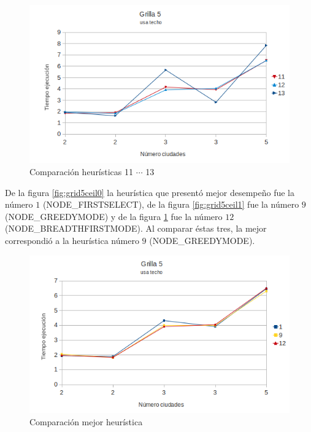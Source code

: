 \documentclass[a4paper,10pt]{article}
\begin{document}
\begin{figure}[ht]
\begin{minipage}[b]{1\linewidth}
  \centering
 \includegraphics[scale=0.4]{grilla5ceil2.png}
 \caption{Comparación heurísticas  11 $\cdots$ 13}
 \label{fig:grid5ceil2}
\end{minipage}

\end{figure}


De la figura \ref{fig:grid5ceil0} la heurística que presentó mejor desempeño fue la número $1$ (NODE\_FIRSTSELECT), de la figura \ref{fig:grid5ceil1} fue la número $9$ (NODE\_GREEDYMODE) y de la 
figura \ref{fig:grid5ceil2} fue la número $12$ (NODE\_BREADTHFIRSTMODE). Al comparar éstas tres, la mejor correspondió a la heurística número $9$ (NODE\_GREEDYMODE).

\begin{figure}[ht]
\begin{minipage}[b]{1\linewidth}
 \centering
 \includegraphics[scale=0.4]{grilla5ceil3.png}
 \caption{Comparación mejor heurística}
 \label{fig:grid5ceil3}
\end{minipage}
\end{figure}
\end{document}

